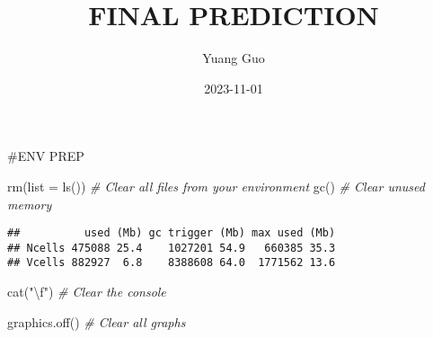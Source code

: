 \documentclass[
]{article}
\title{FINAL PREDICTION}
\author{Yuang Guo}
\date{2023-11-01}
\newenvironment{Shaded}{\begin{snugshade}}{\end{snugshade}}
\newcommand{\AttributeTok}[1]{\textcolor[rgb]{0.77,0.63,0.00}{#1}}
\newcommand{\CommentTok}[1]{\textcolor[rgb]{0.56,0.35,0.01}{\textit{#1}}}
\newcommand{\FunctionTok}[1]{\textcolor[rgb]{0.00,0.00,0.00}{#1}}
\newcommand{\NormalTok}[1]{#1}
\newcommand{\SpecialCharTok}[1]{\textcolor[rgb]{0.00,0.00,0.00}{#1}}
\newcommand{\StringTok}[1]{\textcolor[rgb]{0.31,0.60,0.02}{#1}}
\begin{document}
\maketitle

\#ENV PREP

\begin{Shaded}
\begin{Highlighting}[]
  \FunctionTok{rm}\NormalTok{(}\AttributeTok{list =} \FunctionTok{ls}\NormalTok{()) }\CommentTok{\# Clear all files from your environment}
  \FunctionTok{gc}\NormalTok{()            }\CommentTok{\# Clear unused memory}
\end{Highlighting}
\end{Shaded}

\begin{verbatim}
##          used (Mb) gc trigger (Mb) max used (Mb)
## Ncells 475088 25.4    1027201 54.9   660385 35.3
## Vcells 882927  6.8    8388608 64.0  1771562 13.6
\end{verbatim}

\begin{Shaded}
\begin{Highlighting}[]
  \FunctionTok{cat}\NormalTok{(}\StringTok{"}\SpecialCharTok{\textbackslash{}f}\StringTok{"}\NormalTok{)       }\CommentTok{\# Clear the console}
\end{Highlighting}
\end{Shaded}

\newpage{}

\begin{Shaded}
\begin{Highlighting}[]
  \FunctionTok{graphics.off}\NormalTok{()  }\CommentTok{\# Clear all graphs}
\end{Highlighting}
\end{Shaded}
\end{document}
